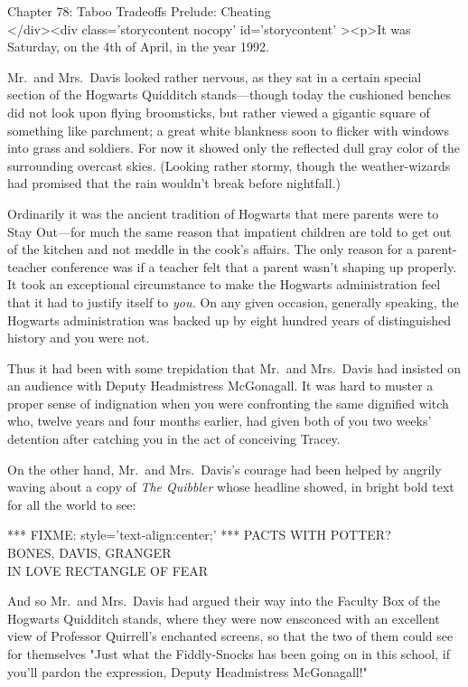 
Chapter 78: Taboo Tradeoffs Prelude: Cheating\\
</div><div  class='storycontent nocopy' id='storycontent' ><p>It was Saturday, 
on the 4th of April, in the year 1992.

Mr.~and Mrs.~Davis looked rather nervous, as they sat in a certain special 
section of the Hogwarts Quidditch stands---though today the cushioned benches 
did not look upon flying broomsticks, but rather viewed a gigantic square of 
something like parchment; a great white blankness soon to flicker with windows 
into grass and soldiers. For now it showed only the reflected dull gray color 
of the surrounding overcast skies. (Looking rather stormy, though the 
weather-wizards had promised that the rain wouldn't break before nightfall.)

Ordinarily it was the ancient tradition of Hogwarts that mere parents were to 
Stay Out---for much the same reason that impatient children are told to get out 
of the kitchen and not meddle in the cook's affairs. The only reason for a 
parent-teacher conference was if a teacher felt that a parent wasn't shaping up 
properly. It took an exceptional circumstance to make the Hogwarts 
administration feel that it had to justify itself to \emph{you.} On any given 
occasion, generally speaking, the Hogwarts administration was backed up by 
eight hundred years of distinguished history and you were not.

Thus it had been with some trepidation that Mr.~and Mrs.~Davis had insisted on 
an audience with Deputy Headmistress McGonagall. It was hard to muster a proper 
sense of indignation when you were confronting the same dignified witch who, 
twelve years and four months earlier, had given both of you two weeks' 
detention after catching you in the act of conceiving Tracey.

On the other hand, Mr.~and Mrs.~Davis's courage had been helped by angrily 
waving about a copy of \emph{The Quibbler} whose headline showed, in bright 
bold text for all the world to see:

*** FIXME: style='text-align:center;' ***
PACTS WITH POTTER?\\
BONES, DAVIS, GRANGER\\
IN LOVE RECTANGLE OF FEAR

And so Mr.~and Mrs.~Davis had argued their way into the Faculty Box of the 
Hogwarts Quidditch stands, where they were now ensconced with an excellent view 
of Professor Quirrell's enchanted screens, so that the two of them could see 
for themselves "Just what the Fiddly-Snocks has been going on in this school, 
if you'll pardon the expression, Deputy Headmistress McGonagall!"

